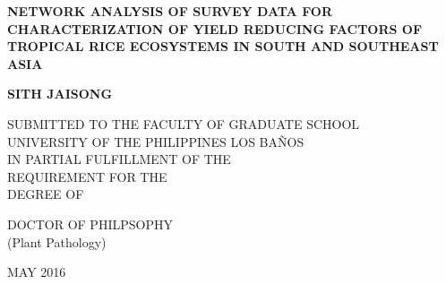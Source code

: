 \pagestyle{empty}

\begin{titlepage}
\begin{spacing}{1}
        \begin{center}
        \vspace*{0cm}

        \large
        {\bf NETWORK ANALYSIS OF SURVEY DATA FOR CHARACTERIZATION OF YIELD REDUCING FACTORS OF TROPICAL RICE ECOSYSTEMS IN SOUTH AND SOUTHEAST ASIA}

        \vspace*{6.0cm}

        \large
        \bf{SITH JAISONG} \\

        \vspace*{5.0cm}

        \large
        SUBMITTED TO THE FACULTY OF GRADUATE SCHOOL\\
        UNIVERSITY OF THE PHILIPPINES LOS BA\~NOS\\ 
        IN PARTIAL FULFILLMENT OF THE \\
        REQUIREMENT FOR THE \\ 
        DEGREE OF \\
        \vspace*{2.0cm}
        \begin{singlespace}
        DOCTOR OF PHILPSOPHY \\
        (Plant Pathology) \\
		\end{singlespace}
        \vspace*{2.0cm}
        MAY 2016
        \end{center}
        \end{spacing}
\end{titlepage}
\cleardoublepage